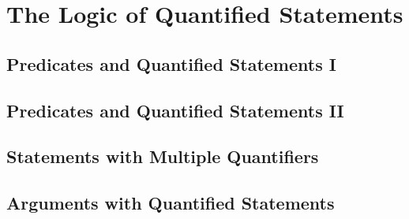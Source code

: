 \section{The Logic of Quantified Statements}
\subsection{Predicates and Quantified Statements I}
\subsection{Predicates and Quantified Statements II}
\subsection{Statements with Multiple Quantifiers}
\subsection{Arguments with Quantified Statements}